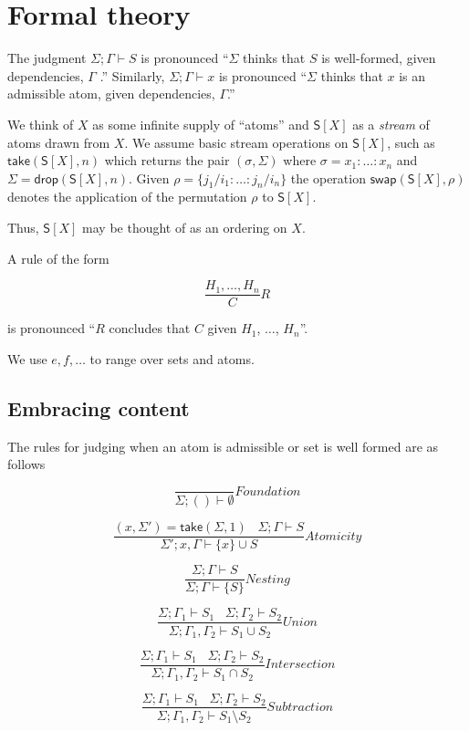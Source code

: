 \section{Formal theory}
The judgment \(\Sigma; \Gamma \vdash S\) is pronounced
``\(\Sigma\) thinks that \(S\) is well-formed, given
dependencies, \(\Gamma\) .'' Similarly,
\(\Sigma; \Gamma \vdash x\) is pronounced
``\(\Sigma\) thinks that \(x\) is an admissible atom, given
dependencies, \(\Gamma\).''

We think of $X$ as some infinite supply of ``atoms'' and
$\mathsf{S}[X]$ as a \emph{stream} of atoms drawn from $X$. We assume
basic stream operations on $\mathsf{S}[X]$, such as
$\mathsf{take}(\mathsf{S}[X],n)$ which returns the pair
$(\sigma,\Sigma)$ where $\sigma = x_{1}:\ldots:x_{n}$ and $\Sigma = \mathsf{drop}(\mathsf{S}[X],n)$. Given $\rho = \{j_{1}/i_{1}:\ldots:j_{n}/i_{n}\}$ the operation
$\mathsf{swap}(\mathsf{S}[X],\rho)$ denotes the application of the
permutation $\rho$ to $\mathsf{S}[X]$.

Thus, $\mathsf{S}[X]$ may be thought of as an ordering on $X$.

A rule of the form

\[\frac{ H_1, \ldots , H_n }{ C }R\]

is pronounced ``\(R\) concludes that \(C\) given \(H_1\), \(\ldots\),
\(H_n\)''.

We use $e,f,\ldots$ to range over sets and atoms.

\subsection{Embracing content}
The rules for judging when an atom is admissible or set is well
formed are as follows

\[\frac{ }{ \Sigma; () \vdash \emptyset}Foundation\]

\[\frac{ (x,\Sigma') = \mathsf{take}(\Sigma,1) \;\;\; \Sigma; \Gamma \vdash S}{ \Sigma'; x,\Gamma \vdash \{ x \} \cup S}Atomicity\]

\[\frac{ \Sigma; \Gamma \vdash S }{ \Sigma; \Gamma \vdash \{ S \}}Nesting\]

\[\frac{ \Sigma; \Gamma_1 \vdash S_1 \;\;\; \Sigma; \Gamma_2 \vdash S_2}{ \Sigma; \Gamma_1, \Gamma_2 \vdash S_1 \cup S_2}Union\]

\[\frac{ \Sigma; \Gamma_1 \vdash S_1 \;\;\; \Sigma; \Gamma_2 \vdash S_2}{ \Sigma; \Gamma_1, \Gamma_2 \vdash S_1 \cap S_2}Intersection\]

\[\frac{ \Sigma; \Gamma_1 \vdash S_1 \;\;\; \Sigma; \Gamma_2 \vdash S_2}{ \Sigma; \Gamma_1, \Gamma_2 \vdash S_1 \setminus S_2}Subtraction\]

